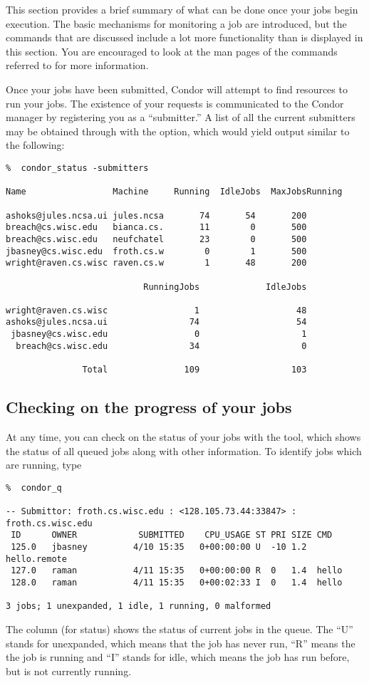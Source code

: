 This section provides a brief summary of what can be done once your jobs
begin execution.  The basic mechanisms for monitoring a job are introduced,
but the commands that are discussed include a lot more functionality than is
displayed in this section.  You are encouraged to look at the man pages of 
the commands referred to for more information.

Once your jobs have been submitted, Condor will attempt to find resources
to run your jobs.  The existence of your requests is communicated to the
Condor manager by registering you as a ``submitter.''  A list of all the
current submitters may be obtained through  with the 
 option, which would yield output similar to the following:
\begin{verbatim}
%  condor_status -submitters

Name                 Machine     Running  IdleJobs  MaxJobsRunning

ashoks@jules.ncsa.ui jules.ncsa       74       54       200
breach@cs.wisc.edu   bianca.cs.       11        0       500
breach@cs.wisc.edu   neufchatel       23        0       500
jbasney@cs.wisc.edu  froth.cs.w        0        1       500
wright@raven.cs.wisc raven.cs.w        1       48       200

                           RunningJobs             IdleJobs

wright@raven.cs.wisc                 1                   48
ashoks@jules.ncsa.ui                74                   54
 jbasney@cs.wisc.edu                 0                    1
  breach@cs.wisc.edu                34                    0

               Total               109                  103
\end{verbatim}

\subsection{Checking on the progress of your jobs}
At any time, you can check on the status of your jobs with the 
tool, which shows the status of all queued jobs along with other information.
To identify jobs which are running, type
\begin{verbatim}
%  condor_q

-- Submittor: froth.cs.wisc.edu : <128.105.73.44:33847> : froth.cs.wisc.edu
 ID      OWNER            SUBMITTED    CPU_USAGE ST PRI SIZE CMD               
 125.0   jbasney         4/10 15:35   0+00:00:00 U  -10 1.2  hello.remote      
 127.0   raman           4/11 15:35   0+00:00:00 R  0   1.4  hello             
 128.0   raman           4/11 15:35   0+00:02:33 I  0   1.4  hello             

3 jobs; 1 unexpanded, 1 idle, 1 running, 0 malformed

\end{verbatim}
The \verb@ST@ column (for status) shows the status of current jobs in the queue.
The ``U'' stands for unexpanded, which means that the job has never run,
``R'' means the the job is running and ``I'' stands for idle, which means the
job has run before, but is not currently running.

